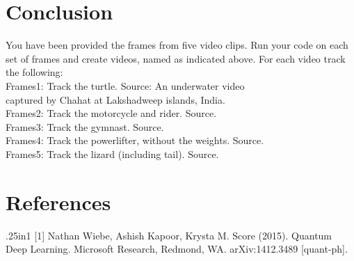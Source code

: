 \documentclass[15pt]{article}
\begin{document}
\section{Conclusion}
You have been provided the frames from five video clips. Run your code on each set of frames and create videos, named as indicated above. For each video track the following:\\

Frames1: Track the turtle. Source: An underwater video\\ captured by Chahat at Lakshadweep islands, India.\\
Frames2: Track the motorcycle and rider. Source.\\
Frames3: Track the gymnast. Source.\\
Frames4: Track the powerlifter, without the weights. Source.\\
Frames5: Track the lizard (including tail). Source. \\



\section*{References}
\small
\begin{hangparas}{.25in}{1}
[1] Nathan Wiebe, Ashish Kapoor, Krysta M. Score (2015). Quantum Deep Learning. Microsoft Research, Redmond, WA. arXiv:1412.3489 [quant-ph].


\end{hangparas}
\end{document}

